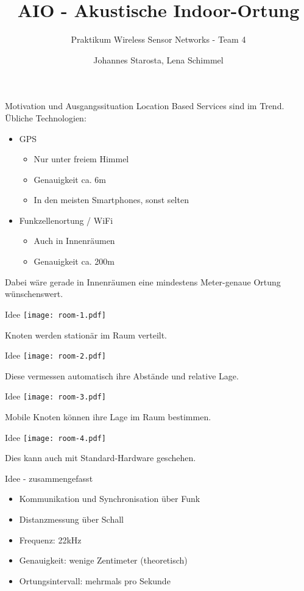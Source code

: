 \documentclass[fleqn,11pt]{beamer}
\title{AIO - Akustische Indoor-Ortung}
\subtitle{Praktikum Wireless Sensor Networks - Team 4}
\author{Johannes Starosta, Lena Schimmel}
\begin{document}
\begin{frame}[plain]
\titlepage
\end{frame}


\begin{frame}{Motivation und Ausgangssituation}
Location Based Services sind im Trend. Übliche Technologien:
\begin{itemize}
  \item GPS
  	\begin{itemize}
	  \item Nur unter freiem Himmel
	  \item Genauigkeit ca. 6m
	  \item In den meisten Smartphones, sonst selten
	\end{itemize}
  \item Funkzellenortung / WiFi
  	\begin{itemize}
	  \item Auch in Innenräumen
	  \item Genauigkeit ca. 200m
	\end{itemize}
\end{itemize}
Dabei wäre gerade in Innenräumen eine mindestens Meter-genaue Ortung wünschenswert.
\end{frame}

\begin{frame}{Idee}
	\texttt{[image: room-1.pdf]}
	
	Knoten werden stationär im Raum verteilt.
\end{frame}


\begin{frame}{Idee}
	\texttt{[image: room-2.pdf]}

	Diese vermessen automatisch ihre Abstände und relative Lage.
\end{frame}


\begin{frame}{Idee}
	\texttt{[image: room-3.pdf]}

	Mobile Knoten können ihre Lage im Raum bestimmen.
\end{frame}


\begin{frame}{Idee}
	\texttt{[image: room-4.pdf]}

	Dies kann auch mit Standard-Hardware geschehen.
\end{frame}

\begin{frame}{Idee - zusammengefasst}
\begin{itemize}
  \item Kommunikation und Synchronisation über Funk
  \item Distanzmessung über Schall
  \item Frequenz: 22kHz
  \item Genauigkeit: wenige Zentimeter (theoretisch)
  \item Ortungsintervall: mehrmals pro Sekunde
\end{itemize}
\end{frame}
\end{document}
